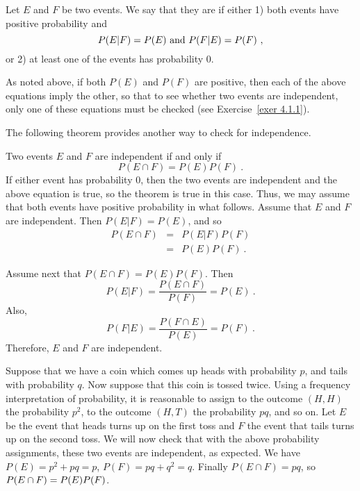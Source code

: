 \begin{definition}\label{def 4.2}
Let $E$ and $F$ be two events.  We say that they are  if either 1) both events have positive probability and
$$
P(E|F) = P(E)\ {\rm and}\ P(F|E) = P(F)\ ,
$$
or 2) at least one of the events has probability 0.
\end{definition}

As noted above, if both $P(E)$ and $P(F)$ are positive, then each of the above equations
imply the other, so that to see whether two events are independent, only one of these
equations must be checked (see Exercise~\ref{exer 4.1.1}).
\par
The following theorem provides another way to check for independence.

\begin{theorem}\label{thm 4.1}
Two events $E$ and $F$ are independent if and only if 
$$P(E\cap F) = P(E)P(F)\ .$$
\proof
If either event has probability 0, then the two events are independent and the above equation 
is true, so the theorem is true in this case.  Thus, we may assume that both events have positive 
probability in what follows. Assume that $E$ and $F$ are independent.  Then $P(E|F) = P(E)$, and so
\begin{eqnarray*}
P(E\cap F) & = & P(E|F)P(F) \\
       & = & P(E)P(F)\ .
\end{eqnarray*}

Assume next that $P(E\cap F) = P(E)P(F)$.  Then
$$
P(E|F) = \frac {P(E \cap F)}{P(F)} = P(E)\ .
$$
Also,
$$
P(F|E) = \frac {P(F \cap E)}{P(E)} = P(F)\ .
$$
Therefore, $E$ and $F$ are independent.
\end{theorem}

\begin{example}\label{exam 4.6}
Suppose that we have a coin which comes up heads with probability $p$, and tails with probability
$q$.  Now suppose that this coin is tossed twice.  Using a frequency interpretation of probability, it is reasonable to assign to the
outcome $(H,H)$ the probability $p^2$, to the outcome $(H, T)$ the probability $pq$, and so on.  
Let $E$ be the event that heads turns up on the first toss and $F$ the event that tails turns up on
the second toss.  We will now check that with the above probability assignments, these two events are
independent, as expected.  We have $P(E) = p^2 + pq = p$, $P(F) = pq + q^2 = q$.  Finally $P(E\cap
F) = pq$, so $P(E\cap F) = \linebreak[4] P(E)P(F)$.  
\end{example}

